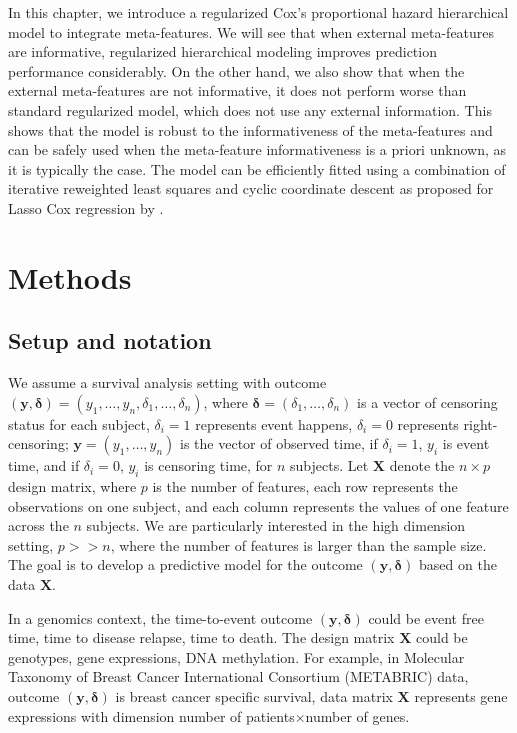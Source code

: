 In this chapter, we introduce a regularized Cox’s proportional hazard hierarchical model to integrate meta-features. We will see that when external meta-features are informative, regularized hierarchical modeling improves prediction performance considerably. On the other hand, we also show that when the external meta-features are not informative, it does not perform worse than standard regularized model, which does not use any external information. This shows that the model is robust to the informativeness of the meta-features and can be safely used when the meta-feature informativeness is a priori unknown, as it is typically the case. The model can be efficiently fitted using a combination of iterative reweighted least squares and cyclic coordinate descent as proposed for Lasso Cox regression by \cite{simon2011regularization}.

\section{Methods}
\subsection{Setup and notation}
We assume a survival analysis setting with outcome $(\bm{y},\bm{\delta})=(y_1,\dots,y_n,\delta_1,\dots,\delta_n)$, where $\bm{\delta}=(\delta_1,\dots,\delta_n)$ is a vector of censoring status for each subject, $\delta_i=1$ represents event happens, $\delta_i=0$ represents right-censoring; $\bm{y}=(y_1,\dots,y_n)$ is the vector of observed time, if $\delta_i=1$, $y_i$ is event time, and if $\delta_i=0$, $y_i$ is censoring time, for $n$ subjects. Let $\bm{X}$ denote the $n\times p$ design matrix, where $p$ is the number of features, each row represents the observations on one subject, and each column represents the values of one feature across the $n$ subjects. We are particularly interested in the high dimension setting, $p>>n$, where the number of features is larger than the sample size. The goal is to develop a predictive model for the outcome $(\bm{y},\bm{\delta})$ based on the data $\bm{X}$.

In a genomics context, the time-to-event outcome $(\bm{y},\bm{\delta})$ could be event free time, time to disease relapse, time to death. The design matrix $\bm{X}$ could be genotypes, gene expressions, DNA methylation. For example, in Molecular Taxonomy of Breast Cancer International Consortium (METABRIC) data, outcome $(\bm{y},\bm{\delta})$ is breast cancer specific survival, data matrix $\bm{X}$ represents gene expressions with dimension number of patients$\times$number of genes.

